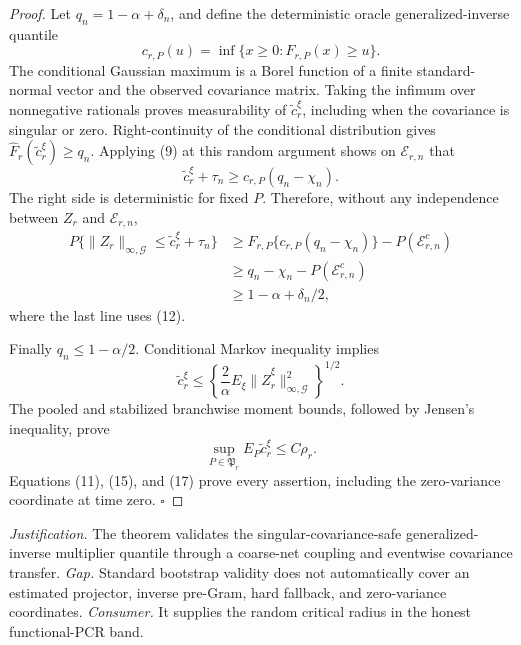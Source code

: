 \documentclass{article}
\begin{document}
\begin{proof}
Let \(q_n=1-\alpha+\delta_n\), and define the deterministic oracle generalized-inverse quantile
\[
 c_{r,P}(u)=\inf\{x\ge0:F_{r,P}(x)\ge u\}.             \tag{13}
\]
The conditional Gaussian maximum is a Borel function of a finite standard-normal vector and the observed covariance matrix.  Taking the infimum over nonnegative rationals proves measurability of \(\widetilde c_r^\xi\), including when the covariance is singular or zero.  Right-continuity of the conditional distribution gives
\(\widehat F_r(\widetilde c_r^\xi)\ge q_n\).  Applying (9) at this random argument shows on \(\mathcal E_{r,n}\) that
\[
 \widetilde c_r^\xi+\tau_n
 \ge c_{r,P}(q_n-\chi_n).                               \tag{14}
\]
The right side is deterministic for fixed \(P\).  Therefore, without any independence between \(Z_r\) and \(\mathcal E_{r,n}\),
\[
\begin{aligned}
 P\{\|Z_r\|_{\infty,\mathcal G}
       \le\widetilde c_r^\xi+\tau_n\}
 &\ge F_{r,P}\{c_{r,P}(q_n-\chi_n)\}
       -P(\mathcal E_{r,n}^c)\\
 &\ge q_n-\chi_n-P(\mathcal E_{r,n}^c)\\
 &\ge1-\alpha+\delta_n/2,
\end{aligned}                                           \tag{15}
\]
where the last line uses (12).

Finally \(q_n\le1-\alpha/2\).  Conditional Markov inequality implies
\[
 \widetilde c_r^\xi
 \le\left\{\frac2\alpha E_\xi
 \|\widehat Z_r^\xi\|_{\infty,\mathcal G}^2\right\}^{1/2}. \tag{16}
\]
The pooled and stabilized branchwise moment bounds, followed by Jensen's inequality, prove
\[
 \sup_{P\in\mathfrak P_r}E_P\widetilde c_r^\xi\le C\rho_r. \tag{17}
\]
Equations (11), (15), and (17) prove every assertion, including the zero-variance coordinate at time zero. \(\square\)
\end{proof}
\par\smallskip\noindent \textit{Justification.} The theorem validates the singular-covariance-safe generalized-inverse multiplier quantile through a coarse-net coupling and eventwise covariance transfer. \textit{Gap.} Standard bootstrap validity does not automatically cover an estimated projector, inverse pre-Gram, hard fallback, and zero-variance coordinates. \textit{Consumer.} It supplies the random critical radius in the honest functional-PCR band.
\end{document}
